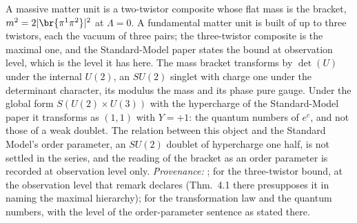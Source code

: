 A massive matter unit is a two-twistor composite whose flat mass is the bracket, $m^{2} = 2|\br{\pi^{1}\pi^{2}}|^{2}$ at $\Lambda = 0$. A fundamental matter unit is built of up to three twistors, each the vacuum of three pairs; the three-twistor composite is the maximal one, and the Standard-Model paper states the bound at observation level, which is the level it has here. The mass bracket transforms by $\det(U)$ under the internal $U(2)$, an $SU(2)$ singlet with charge one under the determinant character, its modulus the mass and its phase pure gauge. Under the global form $S(U(2) \times U(3))$ with the hypercharge of the Standard-Model paper it transforms as $(1,1)$ with $Y = +1$: the quantum numbers of $e^{c}$, and not those of a weak doublet. The relation between this object and the Standard Model's order parameter, an $SU(2)$ doublet of hypercharge one half, is not settled in the series, and the reading of the bracket as an order parameter is recorded at observation level only. \emph{Provenance:} \cite[Prop.~4.1]{ButlerT11}; \cite[Rem.~3.3]{ButlerT12} for the three-twistor bound, at the observation level that remark declares (Thm.~4.1 there presupposes it in naming the maximal hierarchy); \cite[Props.~3.1-3.2]{ButlerT12} for the transformation law and the quantum numbers, with the level of the order-parameter sentence as stated there.
